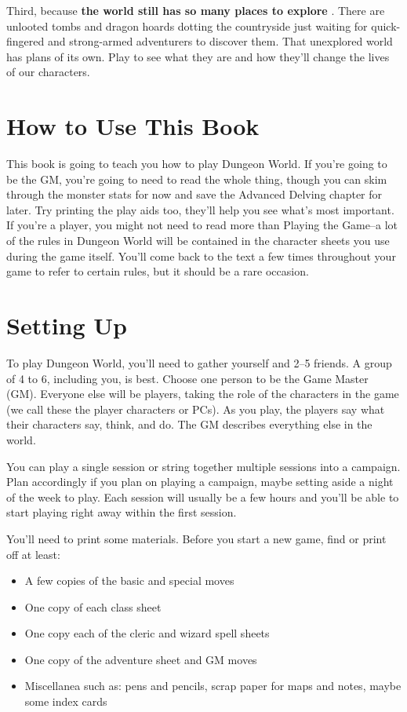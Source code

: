  Third, because \textbf{the world still has so many places to explore}
. There are unlooted tombs and dragon hoards dotting the countryside just waiting for quick-fingered and strong-armed adventurers to discover them. That unexplored world has plans of its own. Play to see what they are and how they'll change the lives of our characters.
\section{How to Use This Book}


 This book is going to teach you how to play Dungeon World. If you're going to be the GM, you're going to need to read the whole thing, though you can skim through the monster stats for now and save the Advanced Delving chapter for later. Try printing the play aids too, they'll help you see what's most important. If you're a player, you might not need to read more than Playing the Game--a lot of the rules in Dungeon World will be contained in the character sheets you use during the game itself. You'll come back to the text a few times throughout your game to refer to certain rules, but it should be a rare occasion.
\section{Setting Up}


 To play Dungeon World, you'll need to gather yourself and 2--5 friends. A group of 4 to 6, including you, is best. Choose one person to be the Game Master (GM). Everyone else will be players, taking the role of the characters in the game (we call these the player characters or PCs). As you play, the players say what their characters say, think, and do. The GM describes everything else in the world.


 You can play a single session or string together multiple sessions into a campaign. Plan accordingly if you plan on playing a campaign, maybe setting aside a night of the week to play. Each session will usually be a few hours and you'll be able to start playing right away within the first session.


 You'll need to print some materials. Before you start a new game, find or print off at least:
\begin{itemize}
\item A few copies of the basic and special moves
\item One copy of each class sheet
\item One copy each of the cleric and wizard spell sheets
\item One copy of the adventure sheet and GM moves
\item Miscellanea such as: pens and pencils, scrap paper for maps and notes, maybe some index cards

\end{itemize}


